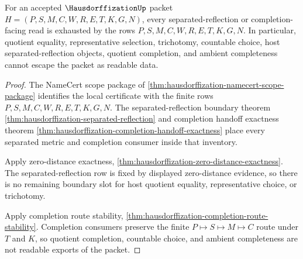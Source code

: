 \begin{theorem}
\label{thm:hausdorffization-separated-reflection-nonescape}
For an accepted $\HausdorffizationUp$ packet $H=(P,S,M,C,W,R,E,T,K,G,N)$, every separated-reflection or completion-facing read is exhausted by the rows $P,S,M,C,W,R,E,T,K,G,N$. In particular, quotient equality, representative selection, trichotomy, countable choice, host separated-reflection objects, quotient completion, and ambient completeness cannot escape the packet as readable data.
\end{theorem}
\begin{proof}
The NameCert scope package of \autoref{thm:hausdorffization-namecert-scope-package} identifies the local certificate with the finite rows $P,S,M,C,W,R,E,T,K,G,N$. The separated-reflection boundary theorem \autoref{thm:hausdorffization-separated-reflection} and completion handoff exactness theorem \autoref{thm:hausdorffization-completion-handoff-exactness} place every separated metric and completion consumer inside that inventory.

Apply zero-distance exactness, \autoref{thm:hausdorffization-zero-distance-exactness}. The separated-reflection row is fixed by displayed zero-distance evidence, so there is no remaining boundary slot for host quotient equality, representative choice, or trichotomy.

Apply completion route stability, \autoref{thm:hausdorffization-completion-route-stability}. Completion consumers preserve the finite $P \longmapsto S \longmapsto M \longmapsto C$ route under $T$ and $K$, so quotient completion, countable choice, and ambient completeness are not readable exports of the packet.
\end{proof}

